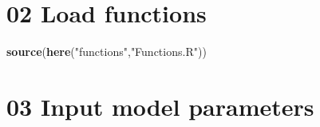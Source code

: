 \documentclass[
]{article}
\newenvironment{Shaded}{\begin{snugshade}}{\end{snugshade}}
\newcommand{\KeywordTok}[1]{\textcolor[rgb]{0.13,0.29,0.53}{\textbf{#1}}}
\newcommand{\NormalTok}[1]{#1}
\newcommand{\StringTok}[1]{\textcolor[rgb]{0.31,0.60,0.02}{#1}}
\begin{document}
\hypertarget{load-functions}{%
\section{02 Load functions}\label{load-functions}}

\begin{Shaded}
\begin{Highlighting}[]
\KeywordTok{source}\NormalTok{(}\KeywordTok{here}\NormalTok{(}\StringTok{"functions"}\NormalTok{,}\StringTok{"Functions.R"}\NormalTok{))}
\end{Highlighting}
\end{Shaded}

\hypertarget{input-model-parameters}{%
\section{03 Input model parameters}\label{input-model-parameters}}
\end{document}
